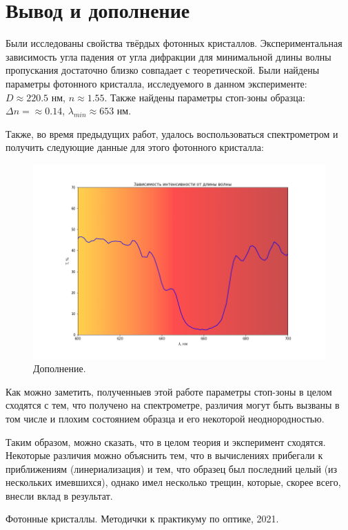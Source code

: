 \documentclass[a4paper, 12pt]{article}
\begin{document}
	\section*{Вывод и дополнение}
	Были исследованы свойства твёрдых фотонных кристаллов. Экспериментальная зависимость угла падения от угла дифракции для минимальной длины волны пропускания достаточно близко совпадает с теоретической. Были найдены параметры фотонного кристалла, исследуемого в данном эксперименте: $D  \approx 220.5 \text{ нм}$, $n  \approx 1.55$. Также найдены параметры стоп-зоны образца: $\Delta n = \approx 0.14$, $\lambda_{min} \approx 653 \text{ нм}$. 
	
	Также, во время предыдущих работ, удалось воспользоваться спектрометром и получить следующие данные для этого фотонного кристалла:
	\begin{figure}[H]
		\centering
		\includegraphics[width=0.85\linewidth]{Spec.png}
		\caption{Дополнение.}
		\label{fig:8}
	\end{figure}
	Как можно заметить, полученныев этой работе параметры стоп-зоны в целом сходятся с тем, что получено на спектрометре, различия могут быть вызваны в том числе и плохим состоянием образца и его некоторой неоднородностью.
	
	Таким образом, можно сказать, что в целом теория и эксперимент сходятся. Некоторые различия можно объяснить тем, что в вычислениях прибегали к приближениям (линериализация) и тем, что образец был последний целый (из нескольких имевшихся), однако имел несколько трещин, которые, скорее всего, внесли вклад в результат.
	\begin{thebibliography}{9}
		Фотонные кристаллы.
		Методички к практикуму по оптике, 2021.
	\end{thebibliography}
\end{document}
